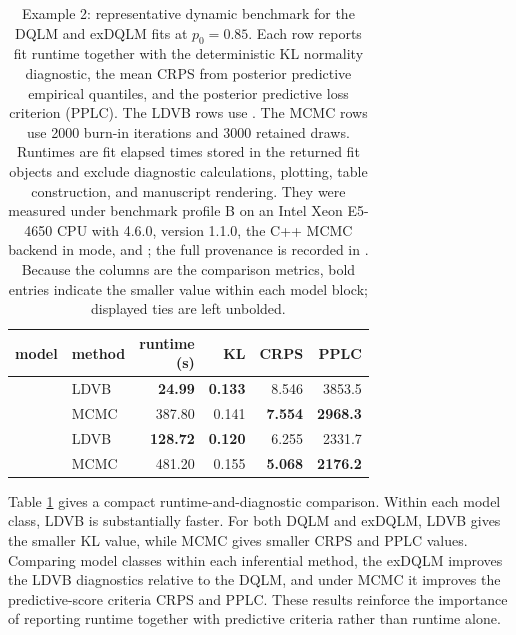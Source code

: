\documentclass{jss}
\newcommand{\tworowcell}[1]{\smash{\raisebox{-0.5\normalbaselineskip}{#1}}}
\newcommand{\TableStyle}{\footnotesize\setlength{\tabcolsep}{4pt}\renewcommand{\arraystretch}{1.08}}
\begin{document}
\begin{table}[t!]
\centering
\TableStyle
\begin{tabular}{@{}llrrrr@{}}
 \toprule
 model & method & \shortstack{runtime\\(s)} & KL & CRPS & PPLC \\
 \midrule
 \tworowcell{DQLM} & LDVB & \textbf{24.99} & \textbf{0.133} & 8.546 & 3853.5 \\
 & MCMC & 387.80 & 0.141 & \textbf{7.554} & \textbf{2968.3} \\
 \midrule
 \tworowcell{exDQLM} & LDVB & \textbf{128.72} & \textbf{0.120} & 6.255 & 2331.7 \\
 & MCMC & 481.20 & 0.155 & \textbf{5.068} & \textbf{2176.2} \\
 \bottomrule
\end{tabular}
\caption{Example 2: representative dynamic benchmark for the DQLM and exDQLM fits at \(p_0 = 0.85\). Each row reports fit runtime together with the deterministic KL normality diagnostic, the mean CRPS from posterior predictive empirical quantiles, and the posterior predictive loss criterion (PPLC). The LDVB rows use . The MCMC rows use 2000 burn-in iterations and 3000 retained draws. Runtimes are fit elapsed times stored in the returned fit objects and exclude diagnostic calculations, plotting, table construction, and manuscript rendering. They were measured under benchmark profile B on an Intel Xeon E5-4650 CPU with  4.6.0,  version 1.1.0, the C++ MCMC backend in  mode, and ; the full provenance is recorded in . Because the columns are the comparison metrics, bold entries indicate the smaller value within each model block; displayed ties are left unbolded.}
\label{tab:ex2bench}
\end{table}

Table \ref{tab:ex2bench} gives a compact runtime-and-diagnostic comparison. Within each model class, LDVB is substantially faster. For both DQLM and exDQLM, LDVB gives the smaller KL value, while MCMC gives smaller CRPS and PPLC values. Comparing model classes within each inferential method, the exDQLM improves the LDVB diagnostics relative to the DQLM, and under MCMC it improves the predictive-score criteria CRPS and PPLC. These results reinforce the importance of reporting runtime together with predictive criteria rather than runtime alone.

\end{document}
